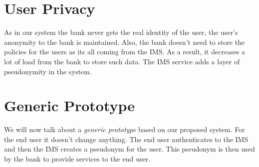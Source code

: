 \section{User Privacy}
As in our system the bank never gets the real identity of the user, the user's anonymity to the bank is maintained. Also, the bank doesn't need to store the policies for the users as its all coming from the IMS. As a result, it decreases a lot of load from the bank to store such data. The IMS service adds a layer of pseudonymity in the system. 

\section{Generic Prototype}
We will now talk about a \textit{generic prototype} based on our proposed system. For the end user it doesn't change anything. The end user authenticates to the IMS and then the IMS creates a pseudonym for the user. This pseudonym is then used by the bank to provide services to the end user.
